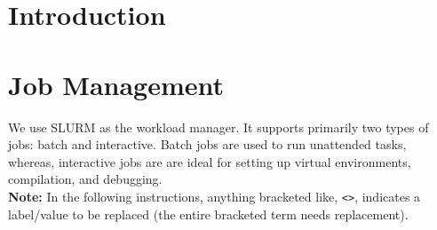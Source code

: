 \documentclass{easychair}
\begin{document}
\tableofcontents
\clearpage

\section{Introduction}
\label{sect:introduction}


\section{Job Management}
\label{sect:job-management}

We use SLURM as the workload manager. It supports primarily two types of jobs: batch and interactive.
Batch jobs are used to run unattended tasks, whereas, 
interactive jobs are are ideal for setting up virtual environments, compilation, and debugging.\\

\noindent \textbf{Note:} In the following instructions, anything bracketed like, \verb+<>+, indicates a
label/value to be replaced (the entire bracketed term needs replacement).\\
\end{document}
